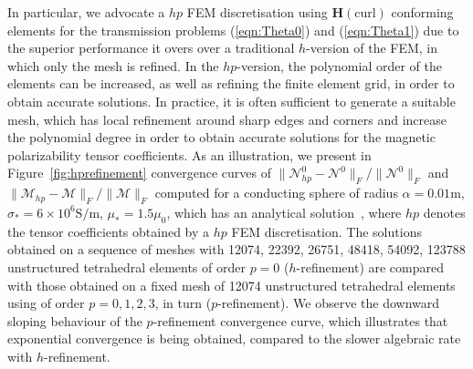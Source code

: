 In particular, we advocate a $hp$ FEM discretisation using $\bm{H}(\text{curl})$ conforming elements 
for the transmission problems (\ref{eqn:Theta0}) and (\ref{eqn:Theta1}) due to the superior performance it overs over a traditional $h$-version of the FEM, in which only the mesh is refined. In the $hp$-version, the polynomial order of the elements can be increased, as well as refining the finite element grid, in order to obtain accurate solutions. In practice, it is often sufficient to generate a suitable mesh, which has local refinement around sharp edges and corners and increase the polynomial degree in order to obtain accurate solutions for the magnetic polarizability tensor coefficients. As an illustration, we present in Figure~\ref{fig:hprefinement} convergence curves of $\| {\mathcal N}_{hp}^0 - {\mathcal N}^0 \|_F / \| {\mathcal N}^0 \|_F $ and  $\| {\mathcal M}_{hp} - {\mathcal M}\|_F / \| {\mathcal M} \|_F $ computed for a conducting sphere of radius $\alpha=0.01\text{m} $, $\sigma_* =6\times10^6  \text{S/m}$, $\mu_* =1.5 \mu_0$, which has an analytical solution~\cite{Wait1951}, where $hp$ denotes the tensor coefficients obtained by a $hp$ FEM discretisation. The solutions obtained on a sequence of meshes with 12074, 22392, 26751, 48418, 54092, 123788 unstructured tetrahedral elements of order $p=0$ ($h$-refinement) are compared with those obtained on a fixed mesh of 12074 unstructured tetrahedral elements using of order $p=0,1,2,3$, in turn ($p$-refinement). We observe the downward sloping behaviour of the $p$-refinement convergence curve, which illustrates that exponential convergence is being obtained, compared to the slower algebraic rate with $h$-refinement.


